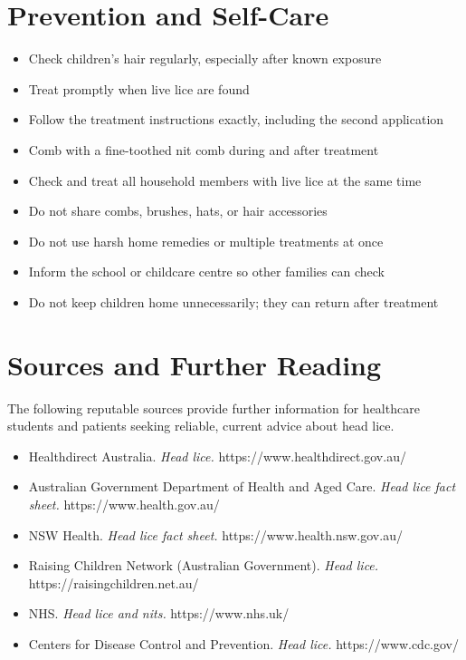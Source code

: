 \section*{Prevention and Self-Care}
\begin{itemize}
    \item Check children's hair regularly, especially after known exposure
    \item Treat promptly when live lice are found
    \item Follow the treatment instructions exactly, including the second application
    \item Comb with a fine-toothed nit comb during and after treatment
    \item Check and treat all household members with live lice at the same time
    \item Do not share combs, brushes, hats, or hair accessories
    \item Do not use harsh home remedies or multiple treatments at once
    \item Inform the school or childcare centre so other families can check
    \item Do not keep children home unnecessarily; they can return after treatment
\end{itemize}

\section*{Sources and Further Reading}
The following reputable sources provide further information for healthcare students and patients seeking reliable, current advice about head lice.

\begin{itemize}
    \item Healthdirect Australia. \textit{Head lice.} https://www.healthdirect.gov.au/
    \item Australian Government Department of Health and Aged Care. \textit{Head lice fact sheet.} https://www.health.gov.au/
    \item NSW Health. \textit{Head lice fact sheet.} https://www.health.nsw.gov.au/
    \item Raising Children Network (Australian Government). \textit{Head lice.} https://raisingchildren.net.au/
    \item NHS. \textit{Head lice and nits.} https://www.nhs.uk/
    \item Centers for Disease Control and Prevention. \textit{Head lice.} https://www.cdc.gov/
\end{itemize}
